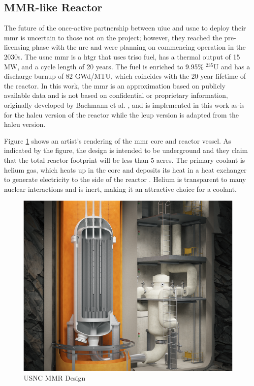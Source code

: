 \subsection{MMR-like Reactor}
\label{sec:mmr}

The future of the once-active partnership between \gls{uiuc} and \gls{usnc} to deploy their \gls{mmr} is uncertain to those not on the project; however, they reached the pre-licensing phase with the \gls{nrc} and were planning on commencing operation in the 2030s. The \gls{usnc} \gls{mmr} is a \gls{htgr} that uses \gls{triso} fuel, has a thermal output of 15 MW, and a cycle length of 20 years. The fuel is enriched to 9.95\% $^{235}$U and has a discharge burnup of 82 GWd/MTU, which coincides with the 20 year lifetime of the reactor. In this work, the \gls{mmr} is an approximation based on publicly available data and is not based on confidential or proprietary information, originally developed by Bachmann et al. \cite{bachmann_mmr_like_2023}, and is implemented in this work as-is for the \gls{haleu} version of the reactor while the \gls{leup} version is adapted from the \gls{haleu} version.

Figure \ref{fig:mmr_design} shows an artist's rendering of the \gls{mmr} core and reactor vessel. As indicated by the figure, the design is intended to be underground and they claim that the total reactor footprint will be less than 5 acres. The primary coolant is helium gas, which heats up in the core and deposits its heat in a heat exchanger to generate electricity to the side of the reactor \cite{usnc_chalk_river}. Helium is transparent to many nuclear interactions and is inert, making it an attractive choice for a coolant.

\begin{figure}[H]
    \centering
    \includegraphics[scale=0.19]{images/reactor_design/wide-02.png}
    \caption{USNC MMR Design \cite{usnc_design_2021}}
    \label{fig:mmr_design}
\end{figure}

